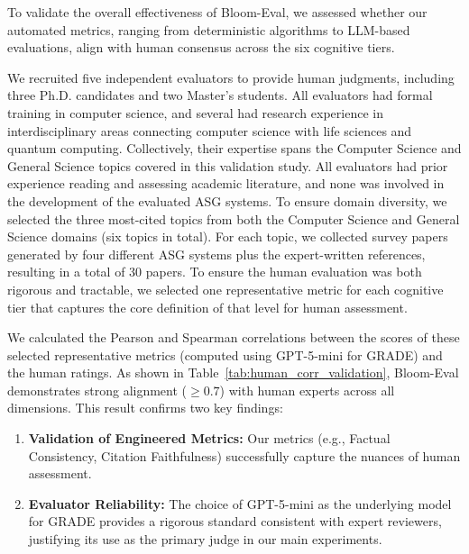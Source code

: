 \documentclass[11pt]{article}
\begin{document}
To validate the overall effectiveness of Bloom-Eval, we assessed whether our automated metrics, ranging from deterministic algorithms to LLM-based evaluations, align with human consensus across the six cognitive tiers.

We recruited five independent evaluators to provide human judgments, including three Ph.D. candidates and two Master's students. All evaluators had formal training in computer science, and several had research experience in interdisciplinary areas connecting computer science with life sciences and quantum computing. Collectively, their expertise spans the Computer Science and General Science topics covered in this validation study. All evaluators had prior experience reading and assessing academic literature, and none was involved in the development of the evaluated ASG systems. To ensure domain diversity, we selected the three most-cited topics from both the Computer Science and General Science domains (six topics in total). For each topic, we collected survey papers generated by four different ASG systems plus the expert-written references, resulting in a total of 30 papers. To ensure the human evaluation was both rigorous and tractable, we selected one representative metric for each cognitive tier that captures the core definition of that level for human assessment.

We calculated the Pearson and Spearman correlations between the scores of these selected representative metrics (computed using GPT-5-mini for GRADE) and the human ratings. As shown in Table~\ref{tab:human_corr_validation}, Bloom-Eval demonstrates strong alignment ($\geq0.7$) with human experts across all dimensions. This result confirms two key findings:
\begin{enumerate} 
\item \textbf{Validation of Engineered Metrics:} Our metrics (e.g., Factual Consistency, Citation Faithfulness) successfully capture the nuances of human assessment.

\item \textbf{Evaluator Reliability:} The choice of GPT-5-mini as the underlying model for GRADE provides a rigorous standard consistent with expert reviewers, justifying its use as the primary judge in our main experiments.
\end{enumerate}
\end{document}

